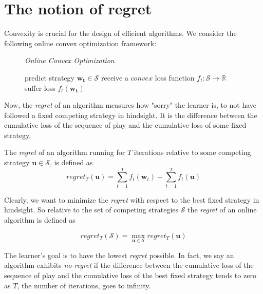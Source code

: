\section{The notion of regret}\label{section:theNotionOfRegret}

Convexity is crucial for the design of efficient algorithms. We consider the following online convex optimization framework\cite{shalev}: \\

\begin{figure}[ht]\centering
    \textit{Online Convex Optimization}
    \begin{minipage}{.7\linewidth}
        \begin{algorithm}[H]
        \DontPrintSemicolon
         {
        predict strategy $\mathbf{w_t \in \mathcal{S}}$ \;
        receive a $convex$ loss function $f_t:\mathcal{S} \to \mathbb{R}$ \;
        suffer loss $f_t(\mathbf{w_t})$ \;
        }
        \end{algorithm}\caption*{}
  \end{minipage}
\end{figure}


Now, the \textit{regret} of an algorithm measures how "sorry" the learner is, to not have followed a fixed competing strategy in hindsight. It is the difference between the cumulative loss of the sequence of play and the cumulative loss of some fixed strategy. 


\begin{definition}\label{def:regret}
The \textit{regret} of an algorithm running for $T$ iterations relative to some competing strategy $\boldsymbol{u} \in \mathcal{S}$, is defined as
\[regret_T(\boldsymbol{u}) = \sum_{t=1}^{T}f_t(\boldsymbol{w}_t) - \sum_{t=1}^{T}f_t(\boldsymbol{u})\]
\end{definition}

Clearly, we want to minimize the \textit{regret} with respect to the best fixed strategy in hindsight. So relative to the set of competing strategies $\mathcal{S}$ the \textit{regret} of an online algorithm is defined as 

\begin{equation*}
    regret_T(\mathcal{S}) = \max_{\boldsymbol{u} \in \mathcal{S}} regret_T(\boldsymbol{u})
\end{equation*}

The learner's goal is to have the lowest \textit{regret} possible. In fact, we say an algorithm exhibits \textit{no-regret} if the difference between the cumulative loss of the sequence of play and the cumulative loss of the best fixed strategy tends to zero as $T$, the number of iterations, goes to infinity.

